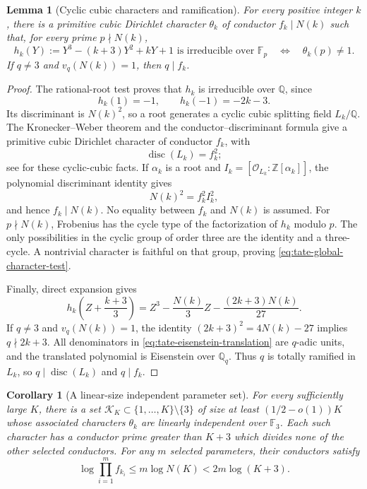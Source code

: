 \documentclass[11pt]{article}
\newtheorem{lemma}[theorem]{Lemma}
\newtheorem{corollary}[theorem]{Corollary}
\theoremstyle{definition}
\theoremstyle{remark}
\begin{document}
\begin{lemma}[Cyclic cubic characters and ramification]
\label{lem:tate-cyclic-character}
For every positive integer $k$, there is a primitive cubic
Dirichlet character $\theta_k$ of conductor $f_k\mid N(k)$
such that, for every prime $p\nmid N(k)$,
\begin{equation}\label{eq:tate-global-character-test}
 h_k(Y):=Y^3-(k+3)Y^2+kY+1
 \text{ is irreducible over }\mathbb F_p
 \quad\Longleftrightarrow\quad\theta_k(p)\ne1.
\end{equation}
If $q\ne3$ and $v_q(N(k))=1$, then $q\mid f_k$.
\end{lemma}

\begin{proof}
The rational-root test proves that $h_k$ is irreducible over
$\mathbb Q$, since
\[
 h_k(1)=-1,\qquad h_k(-1)=-2k-3.
\]
Its discriminant is $N(k)^2$, so a root generates a cyclic
cubic splitting field $L_k/\mathbb Q$.
The Kronecker--Weber theorem and the conductor--discriminant
formula give a primitive cubic Dirichlet character of conductor
$f_k$, with
\[
 \operatorname{disc}(L_k)=f_k^2;
\]
see \citet[p.~472]{SilvesterSpearmanWilliams2006} for these
cyclic-cubic facts.  If $\alpha_k$ is a root and
$I_k=[\mathcal O_{L_k}:\mathbb Z[\alpha_k]]$, the polynomial
discriminant identity gives
\[
 N(k)^2=f_k^2I_k^2,
\]
and hence $f_k\mid N(k)$.  No equality between $f_k$ and
$N(k)$ is assumed.  For $p\nmid N(k)$, Frobenius has the
cycle type of the factorization of $h_k$ modulo $p$.
The only possibilities in the cyclic group of order three are
the identity and a three-cycle.  A nontrivial character is
faithful on that group, proving
\eqref{eq:tate-global-character-test}.

Finally, direct expansion gives
\begin{equation}\label{eq:tate-eisenstein-translation}
 h_k\!\left(Z+\frac{k+3}{3}\right)
 =Z^3-\frac{N(k)}3Z-\frac{(2k+3)N(k)}{27}.
\end{equation}
If $q\ne3$ and $v_q(N(k))=1$, the identity
$(2k+3)^2=4N(k)-27$ implies $q\nmid2k+3$.
All denominators in \eqref{eq:tate-eisenstein-translation}
are $q$-adic units, and the translated polynomial is Eisenstein
over $\mathbb Q_q$.  Thus $q$ is totally ramified in $L_k$,
so $q\mid\operatorname{disc}(L_k)$ and $q\mid f_k$.
\end{proof}

\begin{corollary}[A linear-size independent parameter set]
\label{cor:tate-linear-independent-set}
For every sufficiently large $K$, there is a set
$\mathcal K_K\subset\{1,\ldots,K\}\setminus\{3\}$ of
size at least $(1/2-o(1))K$ whose associated characters
$\theta_k$ are linearly independent over $\mathbb F_3$.
Each such character has a conductor prime greater than $K+3$
which divides none of the other selected conductors.
For any $m$ selected parameters, their conductors satisfy
\[
 \log\prod_{i=1}^m f_{k_i}
 \le m\log N(K)<2m\log(K+3).
\]
\end{corollary}
\end{document}

